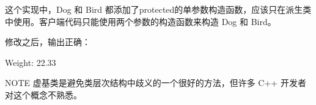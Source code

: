 这个实现中，Dog 和 Bird 都添加了protected的单参数构造函数，应该只在派生类中使用。客户端代码只能使用两个参数的构造函数来构造 Dog 和 Bird。

修改之后，输出正确：

\begin{shell}
Weight: 22.33
\end{shell}

\begin{myNotic}{NOTE}
虚基类是避免类层次结构中歧义的一个很好的方法，但许多 C++ 开发者对这个概念不熟悉。
\end{myNotic}










